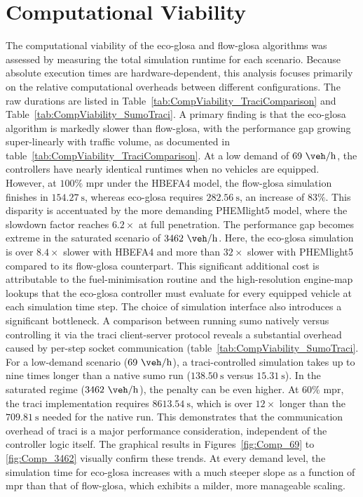\section{Computational Viability}
\label{sec:Results_Computational}

The computational viability of the \ac{eco-glosa} and \ac{flow-glosa} algorithms was assessed by measuring the total simulation runtime for each scenario. Because absolute execution times are hardware-dependent, this analysis focuses primarily on the relative computational overheads between different configurations. The raw durations are listed in Table~\vref{tab:CompViability_TraciComparison} and Table~\vref{tab:CompViability_SumoTraci}.
\mynewline
A primary finding is that the \ac{eco-glosa} algorithm is markedly slower than \ac{flow-glosa}, with the performance gap growing super-linearly with traffic volume, as documented in table~\vref{tab:CompViability_TraciComparison}. At a low demand of $69~\unit{\veh\per\hour}$, the controllers have nearly identical runtimes when no vehicles are equipped. However, at $100\%$ \ac{mpr} under the HBEFA4 model, the \ac{flow-glosa} simulation finishes in $154.27~\unit{\second}$, whereas \ac{eco-glosa} requires $282.56~\unit{\second}$, an increase of $83\%$. This disparity is accentuated by the more demanding PHEMlight5 model, where the slowdown factor reaches $6.2\times$ at full penetration. The performance gap becomes extreme in the saturated scenario of $3462~\unit{\veh\per\hour}$. Here, the \ac{eco-glosa} simulation is over $8.4\times$ slower with HBEFA4 and more than $32\times$ slower with PHEMlight5 compared to its \ac{flow-glosa} counterpart. This significant additional cost is attributable to the fuel-minimisation routine and the high-resolution engine-map lookups that the \ac{eco-glosa} controller must evaluate for every equipped vehicle at each simulation time step.
\mynewline
The choice of simulation interface also introduces a significant bottleneck. A comparison between running \ac{sumo} natively versus controlling it via the \ac{traci} client-server protocol reveals a substantial overhead caused by per-step socket communication (table~\vref{tab:CompViability_SumoTraci}. For a low-demand scenario ($69~\unit{\veh\per\hour}$), a \ac{traci}-controlled simulation takes up to nine times longer than a native \ac{sumo} run ($138.50~\unit{\second}$ versus $15.31~\unit{\second}$). In the saturated regime ($3462~\unit{\veh\per\hour}$), the penalty can be even higher. At $60\%$ \ac{mpr}, the \ac{traci} implementation requires $8613.54~\unit{\second}$, which is over $12\times$ longer than the $709.81~\unit{\second}$ needed for the native run. This demonstrates that the communication overhead of \ac{traci} is a major performance consideration, independent of the controller logic itself.
\mynewline
The graphical results in Figures~\vref{fig:Comp_69} to \vref{fig:Comp_3462} visually confirm these trends. At every demand level, the simulation time for \ac{eco-glosa} increases with a much steeper slope as a function of \ac{mpr} than that of \ac{flow-glosa}, which exhibits a milder, more manageable scaling.

